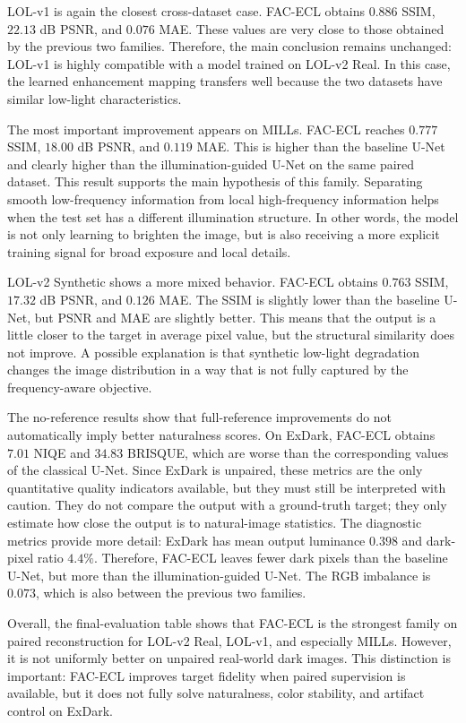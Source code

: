 LOL-v1 is again the closest cross-dataset case. FAC-ECL obtains $0.886$ SSIM, $22.13$ dB PSNR, and $0.076$ MAE. These values are very close to those obtained by the previous two families. Therefore, the main conclusion remains unchanged: LOL-v1 is highly compatible with a model trained on LOL-v2 Real. In this case, the learned enhancement mapping transfers well because the two datasets have similar low-light characteristics.

The most important improvement appears on MILLs. FAC-ECL reaches $0.777$ SSIM, $18.00$ dB PSNR, and $0.119$ MAE. This is higher than the baseline U-Net and clearly higher than the illumination-guided U-Net on the same paired dataset. This result supports the main hypothesis of this family. Separating smooth low-frequency information from local high-frequency information helps when the test set has a different illumination structure. In other words, the model is not only learning to brighten the image, but is also receiving a more explicit training signal for broad exposure and local details.

LOL-v2 Synthetic shows a more mixed behavior. FAC-ECL obtains $0.763$ SSIM, $17.32$ dB PSNR, and $0.126$ MAE. The SSIM is slightly lower than the baseline U-Net, but PSNR and MAE are slightly better. This means that the output is a little closer to the target in average pixel value, but the structural similarity does not improve. A possible explanation is that synthetic low-light degradation changes the image distribution in a way that is not fully captured by the frequency-aware objective.

The no-reference results show that full-reference improvements do not automatically imply better naturalness scores. On ExDark, FAC-ECL obtains $7.01$ NIQE and $34.83$ BRISQUE, which are worse than the corresponding values of the classical U-Net. Since ExDark is unpaired, these metrics are the only quantitative quality indicators available, but they must still be interpreted with caution. They do not compare the output with a ground-truth target; they only estimate how close the output is to natural-image statistics. The diagnostic metrics provide more detail: ExDark has mean output luminance $0.398$ and dark-pixel ratio $4.4\%$. Therefore, FAC-ECL leaves fewer dark pixels than the baseline U-Net, but more than the illumination-guided U-Net. The RGB imbalance is $0.073$, which is also between the previous two families.

Overall, the final-evaluation table shows that FAC-ECL is the strongest family on paired reconstruction for LOL-v2 Real, LOL-v1, and especially MILLs. However, it is not uniformly better on unpaired real-world dark images. This distinction is important: FAC-ECL improves target fidelity when paired supervision is available, but it does not fully solve naturalness, color stability, and artifact control on ExDark.

